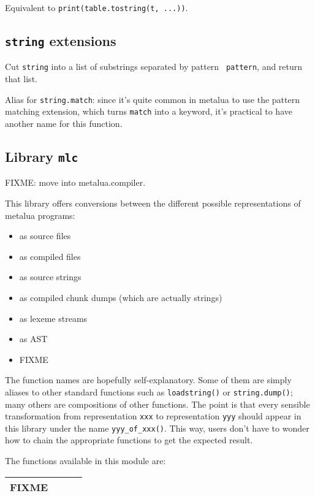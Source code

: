 
Equivalent to {\tt print(table.tostring(t, ...))}.

\subsection{{\tt string} extensions}

Cut {\tt string} into a list of substrings separated by pattern {\tt
  pattern}, and return that list.



Alias for {\tt string.match}: since it's quite common in metalua to
use the pattern matching extension, which turns {\tt match} into a
keyword, it's practical to have another name for this function.

\subsection{Library {\tt mlc}}

FIXME: move into metalua.compiler.

This library offers conversions between the different possible
representations of metalua programs:
\begin{itemize}
\item as source files
\item as compiled files
\item as source strings
\item as compiled chunk dumps (which are actually strings)
\item as lexeme streams
\item as AST
\item FIXME
\end{itemize}

The function names are hopefully self-explanatory. Some of them are
simply aliases to other standard functions such as {\tt loadstring()}
or {\tt string.dump()}; many others are compositions of other
functions. The point is that every sensible transformation from
representation {\tt xxx} to representation {\tt yyy} should appear in
this library under the name {\tt yyy\_of\_xxx()}. This way, users
don't have to wonder how to chain the appropriate functions to get the
expected result.

The functions available in this module are:

\begin{tabular}{|l|l|l|l|}
  \hline
  FIXME \\\hline
\end{tabular}

